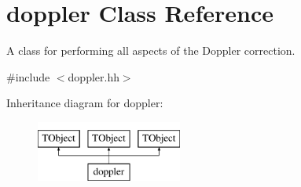 \hypertarget{classdoppler}{\section{doppler Class Reference}
\label{classdoppler}
}


A class for performing all aspects of the Doppler correction.  




{\ttfamily \#include $<$doppler.\-hh$>$}

Inheritance diagram for doppler\-:\begin{figure}[H]
\begin{center}
\leavevmode
\includegraphics[height=2.000000cm]{classdoppler}
\end{center}
\end{figure}
